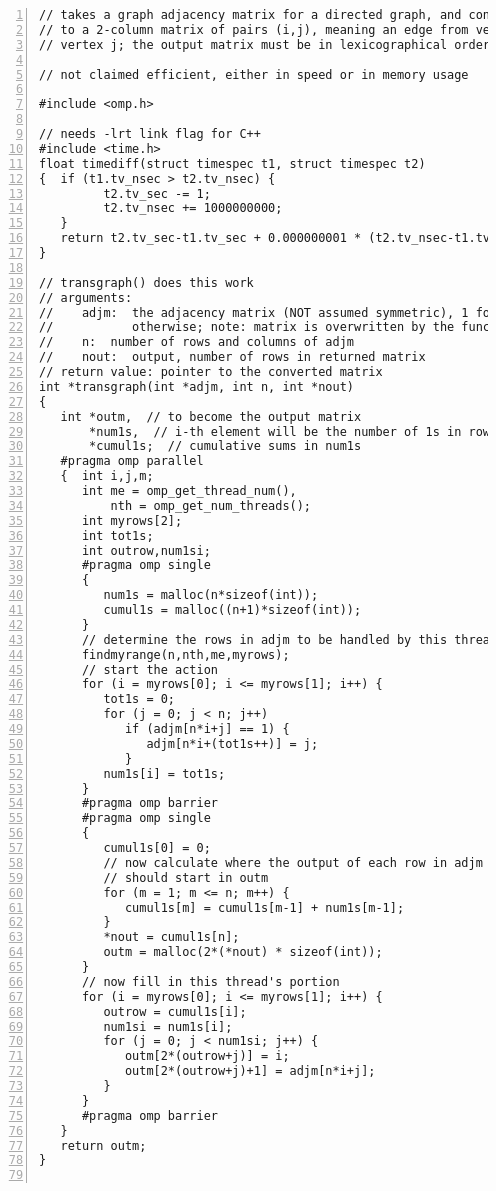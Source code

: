 \begin{lstlisting}[numbers=left]
// takes a graph adjacency matrix for a directed graph, and converts it
// to a 2-column matrix of pairs (i,j), meaning an edge from vertex i to
// vertex j; the output matrix must be in lexicographical order

// not claimed efficient, either in speed or in memory usage

#include <omp.h>

// needs -lrt link flag for C++
#include <time.h>
float timediff(struct timespec t1, struct timespec t2)
{  if (t1.tv_nsec > t2.tv_nsec) {
         t2.tv_sec -= 1;
         t2.tv_nsec += 1000000000;
   }
   return t2.tv_sec-t1.tv_sec + 0.000000001 * (t2.tv_nsec-t1.tv_nsec);
}

// transgraph() does this work
// arguments:
//    adjm:  the adjacency matrix (NOT assumed symmetric), 1 for edge, 0
//           otherwise; note: matrix is overwritten by the function
//    n:  number of rows and columns of adjm
//    nout:  output, number of rows in returned matrix
// return value: pointer to the converted matrix
int *transgraph(int *adjm, int n, int *nout)
{
   int *outm,  // to become the output matrix
       *num1s,  // i-th element will be the number of 1s in row i of adjm
       *cumul1s;  // cumulative sums in num1s
   #pragma omp parallel
   {  int i,j,m;
      int me = omp_get_thread_num(),
          nth = omp_get_num_threads();
      int myrows[2];
      int tot1s;
      int outrow,num1si;
      #pragma omp single
      {
         num1s = malloc(n*sizeof(int));
         cumul1s = malloc((n+1)*sizeof(int));
      }
      // determine the rows in adjm to be handled by this thread
      findmyrange(n,nth,me,myrows);
      // start the action
      for (i = myrows[0]; i <= myrows[1]; i++) {
         tot1s = 0;
         for (j = 0; j < n; j++)
            if (adjm[n*i+j] == 1) {
               adjm[n*i+(tot1s++)] = j;
            }
         num1s[i] = tot1s;
      }
      #pragma omp barrier
      #pragma omp single
      {
         cumul1s[0] = 0;
         // now calculate where the output of each row in adjm
         // should start in outm
         for (m = 1; m <= n; m++) {
            cumul1s[m] = cumul1s[m-1] + num1s[m-1];
         }
         *nout = cumul1s[n];
         outm = malloc(2*(*nout) * sizeof(int));
      }
      // now fill in this thread's portion
      for (i = myrows[0]; i <= myrows[1]; i++) {
         outrow = cumul1s[i];
         num1si = num1s[i];
         for (j = 0; j < num1si; j++) {
            outm[2*(outrow+j)] = i;
            outm[2*(outrow+j)+1] = adjm[n*i+j];
         }
      }
      #pragma omp barrier
   }
   return outm;
}


\end{lstlisting}
